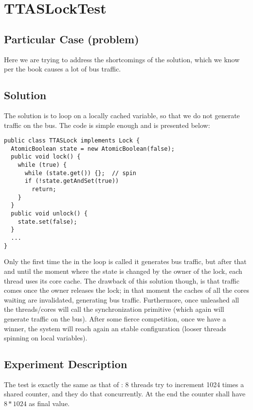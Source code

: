 \section{\textbf{TTASLockTest}}

\subsection{Particular Case (problem)}
Here we are trying to address the shortcomings of the 
solution, which we know per the book causes a lot of bus traffic.

\subsection{Solution}
The solution is to loop on a locally cached variable, so that we do
not generate traffic on the bus. The code is simple enough and is
presented below:

\begin{lstlisting}[style=numbers]
public class TTASLock implements Lock {
  AtomicBoolean state = new AtomicBoolean(false);
  public void lock() {
    while (true) {
      while (state.get()) {};  // spin
      if (!state.getAndSet(true))
        return;
    }
  }
  public void unlock() {
    state.set(false);
  }
  ...
}
\end{lstlisting}
\hfill

Only the first time the  in the loop is called it generates bus
traffic, but after that and until the moment where the state is
changed by the owner of the lock, each thread uses its core cache. The
drawback of this solution though, is that traffic comes once the owner
releases the lock; in that moment the caches of all the cores waiting
are invalidated, generating bus traffic. Furthermore, once unleashed
all the threads/cores will call the synchronization primitive
 (which again will generate traffic on the bus). After
some fierce competition, once we have a winner, the system will reach
again an stable configuration (looser threads spinning on local
variables). 

\subsection{Experiment Description}
The test is exactly the same as that of : 8 threads
try to increment 1024 times a shared counter, and they do that
concurrently. At the end the counter shall have $8 * 1024$ as final
value. 

